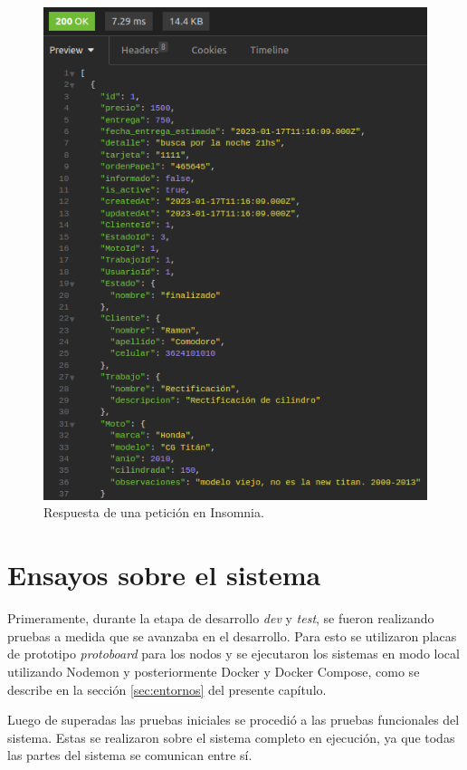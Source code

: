 \begin{figure}[H]
	\centering
	\includegraphics[scale=.55]{./Figures/insomnia-request-2.png}
	\caption{Respuesta de una petición en Insomnia.}
	\label{fig:insomnia-request-2}
\end{figure}


\section{Ensayos sobre el sistema}
\label{sec:ensayos-nodos}

Primeramente, durante la etapa de desarrollo \textit{dev} y \textit{test}, se fueron realizando pruebas a medida que se avanzaba en el desarrollo. Para esto se utilizaron placas de prototipo \textit{protoboard} para los nodos y se ejecutaron los sistemas en modo local utilizando Nodemon \cite{nodemon} y posteriormente Docker y Docker Compose, como se describe en la sección \ref{sec:entornos} del presente capítulo.

Luego de superadas las pruebas iniciales se procedió a las pruebas funcionales del sistema. Estas se realizaron sobre el sistema completo en ejecución, ya que todas las partes del sistema se comunican entre sí. 

